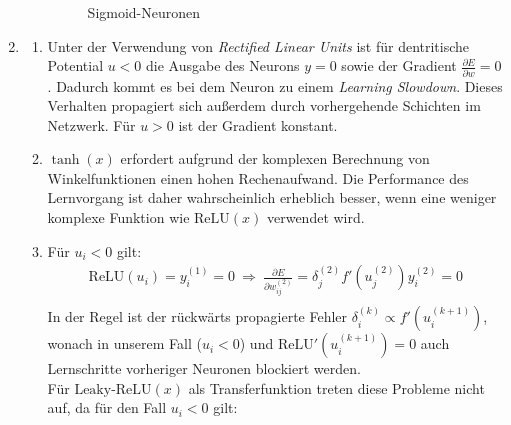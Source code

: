 \documentclass{article}
\newcommand{\relu}{\text{ReLU}}
\newcommand{\leakyrelu}{\text{Leaky-ReLU}}
\begin{document}
\begin{enumerate}
\begin{enumerate}[label=\alph*)]
\begin{figure}[H]
  \caption{Sigmoid-Neuronen}
\end{figure}
\end{enumerate}
\item
\begin{enumerate}[label=\alph*)]
\item
Unter der Verwendung von \textit{Rectified Linear Units} ist für dentritische Potential $u<0$ die Ausgabe des Neurons $y=0$ sowie der Gradient $\frac{\partial E}{\partial w}=0$. Dadurch kommt es bei dem Neuron zu einem \textit{Learning Slowdown}. Dieses Verhalten propagiert sich außerdem durch vorhergehende Schichten im Netzwerk. Für $u>0$ ist der Gradient konstant.
\item
$\tanh(x)$ erfordert aufgrund der komplexen Berechnung von Winkelfunktionen einen hohen Rechenaufwand.
Die Performance des Lernvorgang ist daher wahrscheinlich erheblich besser, wenn eine weniger komplexe Funktion wie $\text{ReLU}(x)$ verwendet wird.
\item
Für $u_i<0$ gilt:
\begin{align*}
\relu(u_i)=y_i^{(1)}=0 \ \Rightarrow \ \frac{\partial E}{\partial w_{ij}^{(2)}}=\delta_j^{(2)} f'(u_j^{(2)}) y_i^{(2)}=0 \\
\end{align*}
In der Regel ist der rückwärts propagierte Fehler $\delta_i^{(k)} \propto f'(u_i^{(k+1)})$, wonach in unserem Fall ($u_i<0$) und $\relu'(u_i^{(k+1)})=0$ auch Lernschritte vorheriger Neuronen blockiert werden.\\
Für $\leakyrelu(x)$ als Transferfunktion treten diese Probleme nicht auf, da für den Fall $u_i<0$ gilt:

\end{enumerate}
\end{enumerate}
\end{document}

